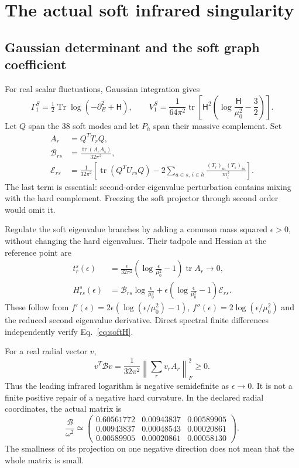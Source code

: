 \documentclass[11pt]{article}
\newcommand{\tr}{\operatorname{tr}}
\newcommand{\Tr}{\operatorname{Tr}}
\begin{document}
\section{The actual soft infrared singularity}
\subsection{Gaussian determinant and the soft graph coefficient}
For real scalar fluctuations, Gaussian integration gives
\begin{equation}
 \Gamma_1^S=\tfrac12\Tr\log(-\partial_E^2+\mathsf H),\qquad
 V_1^S=\frac1{64\pi^2}\tr\left[
 \mathsf H^2\left(\log\frac{\mathsf H}{\mu_0^2}-\frac32\right)\right].
\end{equation}
Let $Q$ span the 38 soft modes and let $P_h$ span their massive
complement. Set
\begin{align}
 A_r&=Q^TT_rQ,\\
 \mathcal B_{rs}&=\frac{\tr(A_rA_s)}{32\pi^2},\label{eq:gram}\\
 \mathcal E_{rs}&=\frac1{32\pi^2}\left[
 \tr(Q^TU_{rs}Q)
 -2\sum_{a\in s,\,i\in h}
 \frac{(T_r)_{ai}(T_s)_{ia}}{m_i^2}\right].
\end{align}
The last term is essential: second-order eigenvalue perturbation
contains mixing with the hard complement. Freezing the soft projector
through second order would omit it.

Regulate the soft eigenvalue branches by adding a common mass squared
$\epsilon>0$, without changing the hard eigenvalues. Their tadpole
and Hessian at the reference point are
\begin{align}
 t^s_r(\epsilon)&=\frac{\epsilon}{32\pi^2}
 \left(\log\frac{\epsilon}{\mu_0^2}-1\right)\tr A_r
 \longrightarrow0,\label{eq:softtad}\\
 H^s_{rs}(\epsilon)&=\mathcal B_{rs}\log\frac{\epsilon}{\mu_0^2}
 +\epsilon\left(\log\frac{\epsilon}{\mu_0^2}-1\right)\mathcal E_{rs}.
 \label{eq:softH}
\end{align}
These follow from $f'(\epsilon)=2\epsilon(\log(\epsilon/\mu_0^2)-1)$,
$f''(\epsilon)=2\log(\epsilon/\mu_0^2)$ and the reduced second
eigenvalue derivative. Direct spectral finite differences independently
verify Eq.~\eqref{eq:softH}.

For a real radial vector $v$,
\begin{equation}
 v^T\mathcal Bv=\frac1{32\pi^2}
 \left\|\sum_r v_rA_r\right\|_F^2\geq0.
 \label{eq:psd}
\end{equation}
Thus the leading infrared logarithm is negative semidefinite as
$\epsilon\to0$. It is not a finite positive repair of a negative hard
curvature. In the declared radial coordinates, the actual matrix is
\begin{equation}
 \frac{\mathcal B}{\omega^2}\simeq
 \begin{pmatrix}
 0.60561772&0.00943837&0.00589905\\
 0.00943837&0.00048543&0.00020861\\
 0.00589905&0.00020861&0.00058130
 \end{pmatrix}.
\end{equation}
The smallness of its projection on one negative direction does not
mean that the whole matrix is small.
\end{document}
